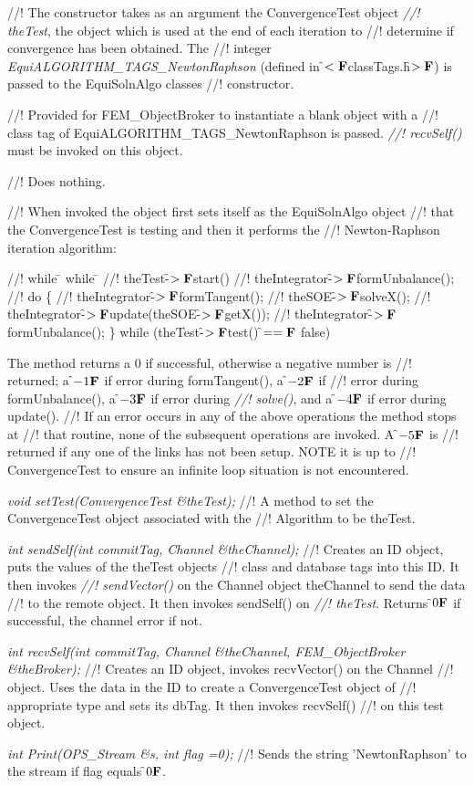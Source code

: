 //! The constructor takes as an argument the ConvergenceTest object {\em
//! theTest}, the object which is used at the end of each iteration to
//! determine if convergence has been obtained. The
//! integer {\em EquiALGORITHM\_TAGS\_NewtonRaphson} (defined in
\f$<{\bf F}$classTags.h\f$>{\bf F}$) is passed to the EquiSolnAlgo classes
//! constructor. 

//! Provided for FEM\_ObjectBroker to instantiate a blank object with a
//! class tag of EquiALGORITHM\_TAGS\_NewtonRaphson is passed. {\em
//! recvSelf()} must be invoked on this object.

//! Does nothing.

//! When invoked the object first sets itself as the EquiSolnAlgo object
//! that the ConvergenceTest is testing and then it performs the
//! Newton-Raphson iteration algorithm: 
\begin{tabbing}
//! while \= \+ while \= \kill
//! theTest-\f$>{\bf F}$start()
//! theIntegrator-\f$>{\bf F}$formUnbalance();
//! do \{ \+
//! theIntegrator-\f$>{\bf F}$formTangent();
//! theSOE-\f$>{\bf F}$solveX();
//! theIntegrator-\f$>{\bf F}$update(theSOE-\f$>{\bf F}$getX());
//! theIntegrator-\f$>{\bf F}$formUnbalance(); \-
\} while (theTest-\f$>{\bf F}$test() \f$=={\bf F}$ false)\- 
\end{tabbing}

\noindent The method returns a 0 if successful, otherwise a negative number is
//! returned; a \f$-1{\bf F}$ if error during formTangent(), a \f$-2{\bf F}$ if
//! error during formUnbalance(), a \f$-3{\bf F}$ if error during {\em
//! solve()}, and a \f$-4{\bf F}$ if error during update().
//! If an error occurs in any of the above operations the method stops at
//! that routine, none of the subsequent operations are invoked. A \f$-5{\bf F}$ is
//! returned if any one of the links has not been setup. NOTE it is up to
//! ConvergenceTest to ensure an infinite loop situation is not encountered.

{\em void setTest(ConvergenceTest \&theTest);}
//! A method to set the ConvergenceTest object associated with the
//! Algorithm to be \p theTest.

{\em int sendSelf(int commitTag, Channel \&theChannel);}
//! Creates an ID object, puts the values of the \p theTest objects
//! class and database tags into this ID. It then invokes {\em
//! sendVector()} on the Channel object \p theChannel to send the data
//! to the remote object. It then invokes sendSelf() on {\em
//! theTest}. Returns \f$0{\bf F}$ if successful, the channel error if not.

{\em int recvSelf(int commitTag, Channel \&theChannel, FEM\_ObjectBroker
\&theBroker);} 
//! Creates an ID object, invokes recvVector() on the Channel
//! object. Uses the data in the ID to create a ConvergenceTest object of
//! appropriate type and sets its dbTag. It then invokes recvSelf()
//! on this test object.

{\em int Print(OPS\_Stream \&s, int flag =0);}
//! Sends the string 'NewtonRaphson' to the stream if \p flag equals \f$0{\bf F}$.
